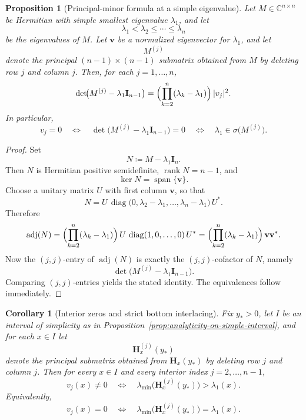 \documentclass[11pt]{article}
\newtheorem{proposition}[theorem]{Proposition}
\newtheorem{corollary}[theorem]{Corollary}
\begin{document}
\begin{proposition}[Principal-minor formula at a simple eigenvalue]\label{prop:principal-minor-formula}
Let \(M\in\mathbb C^{n\times n}\) be Hermitian with simple smallest eigenvalue \(\lambda_1\), and let
\[
\lambda_1<\lambda_2\le \cdots\le \lambda_n
\]
be the eigenvalues of \(M\). Let \(\mathbf v\) be a normalized eigenvector for \(\lambda_1\), and let
\[
M^{(j)}
\]
denote the principal \((n-1)\times(n-1)\) submatrix obtained from \(M\) by deleting row \(j\) and column \(j\). Then, for each \(j=1,\dots,n\),
\[
\det\!\bigl(M^{(j)}-\lambda_1\mathbf I_{n-1}\bigr)
=
\Bigl(\prod_{k=2}^n(\lambda_k-\lambda_1)\Bigr)\,|v_j|^2.
\]
In particular,
\[
v_j=0
\quad\Longleftrightarrow\quad
\det\!\bigl(M^{(j)}-\lambda_1\mathbf I_{n-1}\bigr)=0
\quad\Longleftrightarrow\quad
\lambda_1\in \sigma\!\bigl(M^{(j)}\bigr).
\]
\end{proposition}

\begin{proof}
Set
\[
N\coloneqq M-\lambda_1\mathbf I_n.
\]
Then \(N\) is Hermitian positive semidefinite, \(\operatorname{rank}N=n-1\), and
\[
\ker N=\operatorname{span}\{\mathbf v\}.
\]
Choose a unitary matrix \(U\) with first column \(\mathbf v\), so that
\[
N
=
U\,\operatorname{diag}\bigl(0,\lambda_2-\lambda_1,\dots,\lambda_n-\lambda_1\bigr)\,U^*.
\]
Therefore
\[
\operatorname{adj}(N)
=
\Bigl(\prod_{k=2}^n(\lambda_k-\lambda_1)\Bigr)\,
U\,\operatorname{diag}(1,0,\dots,0)\,U^*
=
\Bigl(\prod_{k=2}^n(\lambda_k-\lambda_1)\Bigr)\,\mathbf v\mathbf v^*.
\]
Now the \((j,j)\)-entry of \(\operatorname{adj}(N)\) is exactly the \((j,j)\)-cofactor of \(N\), namely
\[
\det\!\bigl(M^{(j)}-\lambda_1\mathbf I_{n-1}\bigr).
\]
Comparing \((j,j)\)-entries yields the stated identity. The equivalences follow immediately.
\end{proof}

\begin{corollary}[Interior zeros and strict bottom interlacing]\label{cor:interior-zeros-vs-interlacing}
Fix \(y_*>0\), let \(I\) be an interval of simplicity as in Proposition~\ref{prop:analyticity-on-simple-interval}, and for each \(x\in I\) let
\[
\mathbf H_x^{(j)}(y_*)
\]
denote the principal submatrix obtained from \(\mathbf H_x(y_*)\) by deleting row \(j\) and column \(j\). Then for every \(x\in I\) and every interior index \(j=2,\dots,n-1\),
\[
v_j(x)\neq 0
\quad\Longleftrightarrow\quad
\lambda_{\min}\!\bigl(\mathbf H_x^{(j)}(y_*)\bigr)>\lambda_1(x).
\]
Equivalently,
\[
v_j(x)=0
\quad\Longleftrightarrow\quad
\lambda_{\min}\!\bigl(\mathbf H_x^{(j)}(y_*)\bigr)=\lambda_1(x).
\]
\end{corollary}
\end{document}
